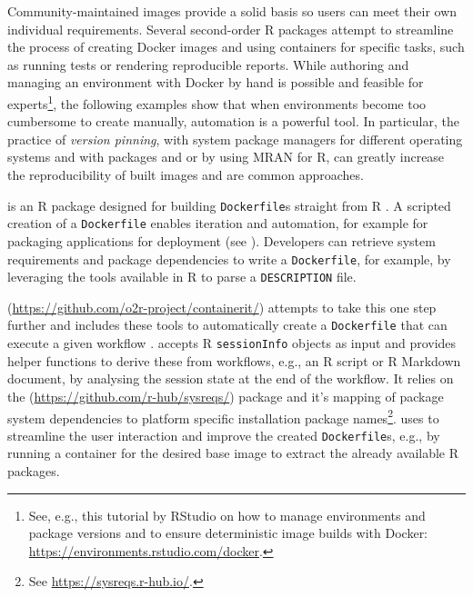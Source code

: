 Community-maintained images provide a solid basis so users can meet
their own individual requirements. Several second-order R packages
attempt to streamline the process of creating Docker images and using
containers for specific tasks, such as running tests or rendering
reproducible reports. While authoring and managing an environment with
Docker by hand is possible and feasible for
experts\footnote{See, e.g., this tutorial by RStudio on how to manage environments and package versions and to ensure deterministic image builds with Docker: \href{https://environments.rstudio.com/docker}{https://environments.rstudio.com/docker}.},
the following examples show that when environments become too cumbersome
to create manually, automation is a powerful tool. In particular, the
practice of \emph{version pinning}, with system package managers for
different operating systems and with packages  and
 or by using MRAN for R, can greatly increase the
reproducibility of built images and are common approaches.

\textbf{} is an R package designed for building
\texttt{Dockerfile}s straight from R \citep{cran_dockerfiler}. A
scripted creation of a \texttt{Dockerfile} enables iteration and
automation, for example for packaging applications for deployment (see
). Developers can retrieve system requirements and
package dependencies to write a \texttt{Dockerfile}, for example, by
leveraging the tools available in R to parse a \texttt{DESCRIPTION}
file.

\textbf{}
(\url{https://github.com/o2r-project/containerit/}) attempts to take
this one step further and includes these tools to automatically create a
\texttt{Dockerfile} that can execute a given workflow
\citep{nust_containerit_2019}.  accepts R
\texttt{sessionInfo} objects as input and provides helper functions to
derive these from workflows, e.g., an R script or R Markdown document,
by analysing the session state at the end of the workflow. It relies on
the  (\url{https://github.com/r-hub/sysreqs/}) package and
it's mapping of package system dependencies to platform specific
installation package
names\footnote{See \href{https://sysreqs.r-hub.io/}{https://sysreqs.r-hub.io/}.}.
 uses  to streamline the user
interaction and improve the created \texttt{Dockerfile}s, e.g., by
running a container for the desired base image to extract the already
available R packages.

